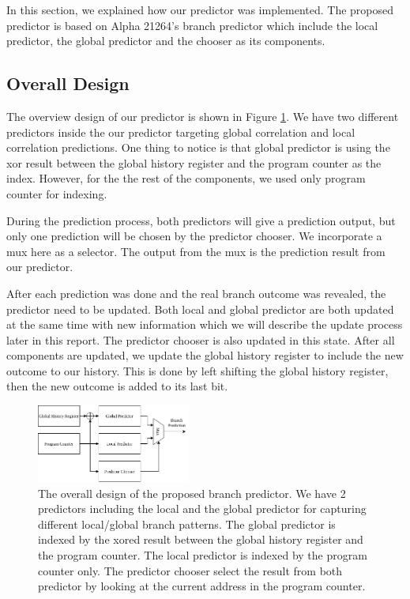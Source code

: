 \documentclass[conference]{IEEEtran}
\begin{document}
In this section, we explained how our predictor was implemented. The proposed predictor is
based on Alpha 21264's branch predictor which include the local predictor, the global predictor
and the chooser as its components.

\subsection{Overall Design}

The overview design of our predictor is shown in Figure \ref{fig:overall_design}. We have two different
predictors inside the our predictor targeting global correlation and local correlation predictions.
One thing to notice is that global predictor is using the xor result between the global history register
and the program counter as the index. However, for the the rest of the components, we used only program
counter for indexing.

During the prediction process, both predictors will give a prediction output, but only one prediction
will be chosen by the predictor chooser. We incorporate a mux here as a selector. The output from the mux
is the prediction result from our predictor.

After each prediction was done and the real branch outcome was revealed, the predictor need to be updated.
Both local and global predictor are both updated at the same time with new information which we will describe
the update process later in this report. The predictor chooser is also updated in this state. After all
components are updated, we update the global history register to include the new outcome to our history.
This is done by left shifting the global history register, then the new outcome is added to its last bit.


\begin{figure}[h]
    \centering
    \includegraphics[width=0.45\textwidth]{imgs/overall_design}
    \caption{The overall design of the proposed branch predictor. We have 2 predictors including
    the local and the global predictor for capturing different local/global branch patterns. The
    global predictor is indexed by the xored result between the global history register and the program
    counter. The local predictor is indexed by the program counter only. The predictor chooser select
    the result from both predictor by looking at the current address in the program counter.}
    \label{fig:overall_design}
\end{figure}
\end{document}

